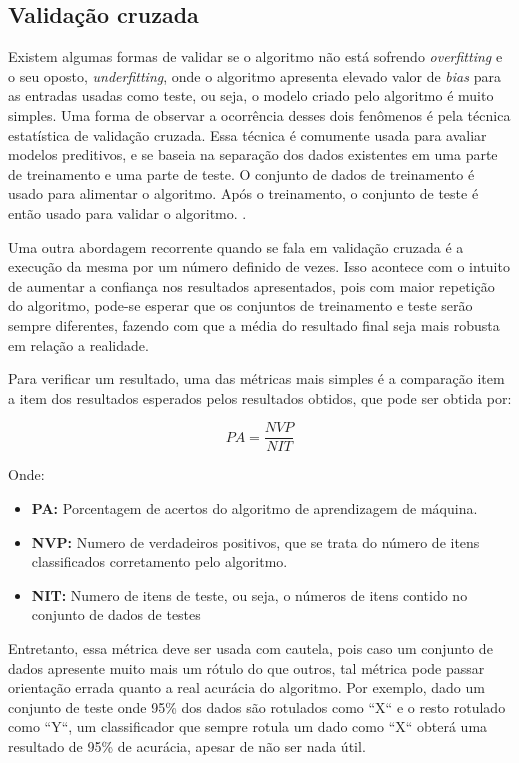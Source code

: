 \subsection{Validação cruzada}\label{subsec:validacao_cruzada}

Existem algumas formas de validar se o algoritmo não está sofrendo \textit{overfitting}
e o seu oposto, \textit{underfitting}, onde o algoritmo apresenta elevado valor
de \textit{bias} para as entradas usadas como teste, ou seja, o modelo criado
pelo algoritmo é muito simples. Uma forma de observar a ocorrência desses dois
fenômenos é pela técnica estatística de validação cruzada. Essa técnica é
comumente usada para avaliar modelos preditivos, e se baseia na separação dos
dados existentes em uma parte de treinamento e uma parte de teste. O conjunto de
dados de treinamento é usado para alimentar o algoritmo. Após o treinamento,
o conjunto de teste é então usado para validar o algoritmo. \cite{araujo2011apprecommender}.

Uma outra abordagem recorrente quando se fala em validação cruzada é a execução
da mesma por um número definido de vezes. Isso acontece com o intuito de
aumentar a confiança nos resultados apresentados, pois com maior repetição do
algoritmo, pode-se esperar que os conjuntos de treinamento e teste serão sempre
diferentes, fazendo com que a média do resultado final seja mais robusta em
relação a realidade.

Para verificar um resultado, uma das métricas mais simples é a comparação item a
item dos resultados esperados pelos resultados obtidos, que pode ser obtida por:

\begin{equation}
PA = \frac{NVP}{NIT}
\end{equation}

Onde:

\begin{itemize}
    \item \textbf{PA:} Porcentagem de acertos do algoritmo de aprendizagem
    de máquina.
    \item \textbf{NVP:} Numero de verdadeiros positivos, que se trata do
    número de itens classificados corretamento pelo algoritmo.
    \item \textbf{NIT:} Numero de itens de teste, ou seja, o números de itens contido no conjunto de dados de testes
\end{itemize}

Entretanto, essa métrica deve ser usada com cautela, pois caso um conjunto de
dados apresente muito mais um rótulo do que outros, tal métrica pode passar
orientação errada quanto a real acurácia do algoritmo. Por exemplo, dado um
conjunto de teste onde 95\% dos dados são rotulados como ``X`` e o resto rotulado
como ``Y``, um classificador que sempre rotula um dado como ``X`` obterá uma
resultado de 95\% de acurácia, apesar de não ser nada útil.

